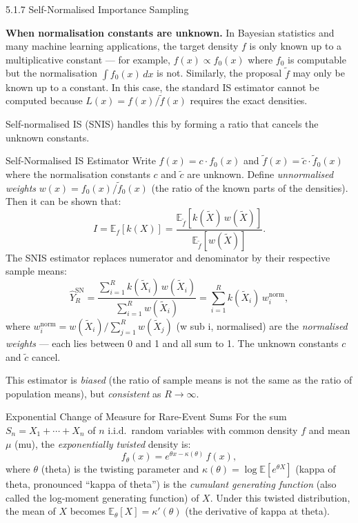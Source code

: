 \documentclass[aspectratio=169,10pt]{beamer}
\begin{document}
\begin{frame}[allowframebreaks]{5.1.7 Self-Normalised Importance Sampling}

\textbf{When normalisation constants are unknown.}
In Bayesian statistics and many machine learning applications, the target
density $f$ is only known up to a multiplicative constant ---
for example, $f(x) \propto f_0(x)$ where $f_0$ is computable but the
normalisation $\int f_0(x)\,dx$ is not.
Similarly, the proposal $\tilde{f}$ may only be known up to a constant.
In this case, the standard IS estimator cannot be computed because $L(x) = f(x)/\tilde{f}(x)$
requires the exact densities.

Self-normalised IS (SNIS) handles this by forming a ratio that cancels the
unknown constants.

\begin{block}{Self-Normalised IS Estimator}
  Write $f(x) = c \cdot f_0(x)$ and $\tilde{f}(x) = \tilde{c}\cdot\tilde{f}_0(x)$
  where the normalisation constants $c$ and $\tilde{c}$ are unknown.
  Define \emph{unnormalised weights} $w(x) = f_0(x)/\tilde{f}_0(x)$ (the ratio of
  the known parts of the densities).  Then it can be shown that:
  \[
    I = \mathbb{E}_f[k(X)]
    = \frac{\mathbb{E}_{\tilde{f}}[k(\tilde{X})\,w(\tilde{X})]}
           {\mathbb{E}_{\tilde{f}}[w(\tilde{X})]}.
  \]
  The SNIS estimator replaces numerator and denominator by their respective
  sample means:
  \[
    \hat{Y}_R^{\mathrm{SN}}
    = \frac{\displaystyle\sum_{i=1}^R k(\tilde{X}_i)\,w(\tilde{X}_i)}
           {\displaystyle\sum_{i=1}^R w(\tilde{X}_i)}
    = \sum_{i=1}^R k(\tilde{X}_i)\,w_i^{\mathrm{norm}},
  \]
  where $w_i^{\mathrm{norm}} = w(\tilde{X}_i) / \sum_{j=1}^R w(\tilde{X}_j)$
  (w sub i, normalised) are the \emph{normalised weights} --- each lies between
  0 and 1 and all sum to 1.  The unknown constants $c$ and $\tilde{c}$ cancel.

  This estimator is \emph{biased} (the ratio of sample means is not the same
  as the ratio of population means), but \emph{consistent} as $R \to \infty$.
\end{block}

\framebreak

\begin{block}{Exponential Change of Measure for Rare-Event Sums}
  For the sum $S_n = X_1 + \cdots + X_n$ of $n$ i.i.d.\ random variables with
  common density $f$ and mean $\mu$ (mu), the \emph{exponentially twisted}
  density is:
  \[
    f_\theta(x) = e^{\theta x - \kappa(\theta)}\,f(x),
  \]
  where $\theta$ (theta) is the twisting parameter and
  $\kappa(\theta) = \log \mathbb{E}[e^{\theta X}]$ (kappa of theta, pronounced
  ``kappa of theta'') is the \emph{cumulant generating function} (also called
  the log-moment generating function) of $X$.
  Under this twisted distribution, the mean of $X$ becomes
  $\mathbb{E}_\theta[X] = \kappa'(\theta)$ (the derivative of kappa at theta).


\end{block}
\end{frame}
\end{document}
